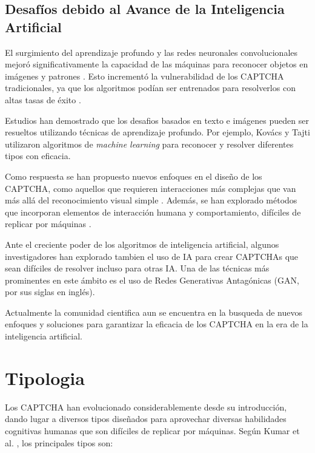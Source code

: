 \documentclass[conference]{IEEEtran}
\begin{document}
\subsection{Desafíos debido al Avance de la Inteligencia Artificial}

El surgimiento del aprendizaje profundo y las redes neuronales convolucionales mejoró significativamente la capacidad de las máquinas para reconocer objetos en imágenes y patrones \cite{Krizhevsky2012}. Esto incrementó la vulnerabilidad de los CAPTCHA tradicionales, ya que los algoritmos podían ser entrenados para resolverlos con altas tasas de éxito \cite{Goodfellow2014}.

Estudios han demostrado que los desafios basados en texto e imágenes pueden ser resueltos utilizando técnicas de aprendizaje profundo. Por ejemplo, Kovács y Tajti \cite{Kovacs2023} utilizaron algoritmos de \textit{machine learning} para reconocer y resolver diferentes tipos con eficacia.

Como respuesta se han propuesto nuevos enfoques en el diseño de los CAPTCHA, como aquellos que requieren interacciones más complejas que van más allá del reconocimiento visual simple \cite{HernandezCastro2010}. Además, se han explorado métodos que incorporan elementos de interacción humana y comportamiento, difíciles de replicar por máquinas \cite{Zhu2010}.

Ante el creciente poder de los algoritmos de inteligencia artificial, algunos investigadores han explorado tambien el uso de IA para crear CAPTCHAs que sean difíciles de resolver incluso para otras IA. Una de las técnicas más prominentes en este ámbito es el uso de Redes Generativas Antagónicas (GAN, por sus siglas en inglés).

Actualmente la comunidad cientifica aun se encuentra en la busqueda de nuevos enfoques y soluciones para garantizar la eficacia de los CAPTCHA en la era de la inteligencia artificial. \cite{Shirali2018}

\bigskip

\section{Tipologia}

Los CAPTCHA han evolucionado considerablemente desde su introducción, dando lugar a diversos tipos diseñados para aprovechar diversas habilidades cognitivas humanas que son difíciles de replicar por máquinas. Según Kumar et al. \cite{Kumar2022}, los principales tipos son:
\end{document}
